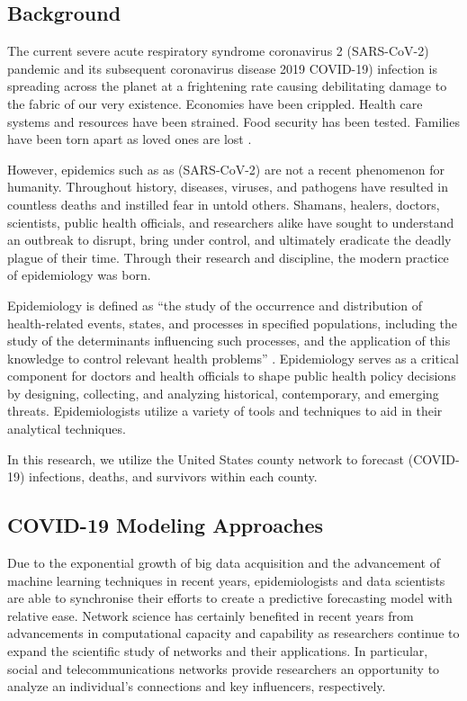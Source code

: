 \subsection{Background}
The current severe acute respiratory syndrome coronavirus 2 (SARS-CoV-2) pandemic and its subsequent coronavirus disease 2019 COVID-19) infection is spreading across the planet at a frightening rate causing debilitating damage to the fabric of our very existence.  Economies have been crippled.  Health care systems and resources have been strained.  Food security has been tested.  Families have been torn apart as loved ones are lost \cite{Impactof55:online}.

However, epidemics such as as (SARS-CoV-2) are not a recent phenomenon for humanity.  Throughout history, diseases, viruses, and pathogens have resulted in countless deaths and instilled fear in untold others.  Shamans, healers, doctors, scientists, public health officials, and researchers alike have sought to understand an outbreak to disrupt, bring under control, and ultimately eradicate the deadly plague of their time.  Through their research and discipline, the modern practice of epidemiology was born.

Epidemiology is defined as ``the study of the occurrence and distribution of health-related events, states, and processes in specified populations, including the study of the determinants influencing such processes, and the application of this knowledge to control relevant health problems'' \cite{epidemiology}.  Epidemiology serves as a critical component for doctors and health officials to shape public health policy decisions by designing, collecting, and analyzing historical, contemporary, and emerging threats.  Epidemiologists utilize a variety of tools and techniques to aid in their analytical techniques.

In this research, we utilize the United States county network to forecast (COVID-19) infections, deaths, and survivors within each county.

\subsection{COVID-19 Modeling Approaches}
Due to the exponential growth of big data acquisition and the advancement of machine learning techniques in recent years, epidemiologists and data scientists are able to synchronise their efforts to create a predictive forecasting model with relative ease.  Network science has certainly benefited in recent years from advancements in computational capacity and capability as researchers continue to expand the scientific study of networks and their applications.  In particular, social and telecommunications networks provide researchers an opportunity to analyze an individual's connections and key influencers, respectively.  


